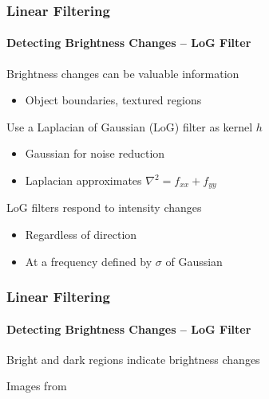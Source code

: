 \documentclass[xetex,professionalfont]{beamer}
\begin{document}
\begin{frame}
\frametitle{Linear Filtering}
\framesubtitle{Detecting Brightness Changes -- LoG Filter}

Brightness changes can be valuable information
\begin{itemize}
    \item Object boundaries, textured regions
\end{itemize}

\bigskip
Use a Laplacian of Gaussian (LoG) filter as kernel $h$ %
\begin{itemize}
    \item Gaussian for noise reduction
    \item Laplacian approximates $\nabla^2=f_{xx}+f_{yy}$ %
\end{itemize}

\bigskip
LoG filters respond to intensity changes %
\begin{itemize}
    \item Regardless of direction
    \item At a frequency defined by $\sigma$ of Gaussian
\end{itemize}

\end{frame}


\begin{frame}
\frametitle{Linear Filtering}
\framesubtitle{Detecting Brightness Changes -- LoG Filter}

Bright and dark regions indicate brightness changes

\bigskip
\begin{center}
    {\centering Images from \cite{prince12}}
\end{center}

\end{frame}
\end{document}
